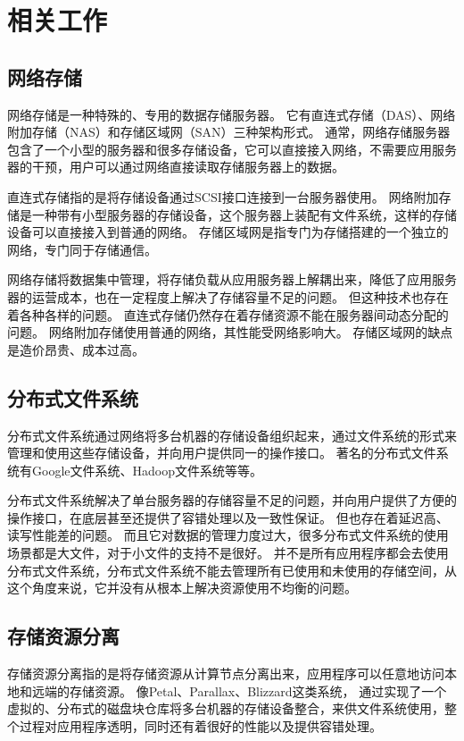 \section{相关工作}

\subsection{网络存储}
网络存储是一种特殊的、专用的数据存储服务器。
它有直连式存储（DAS）、网络附加存储（NAS）和存储区域网（SAN）三种架构形式。
通常，网络存储服务器包含了一个小型的服务器和很多存储设备，它可以直接接入网络，不需要应用服务器的干预，用户可以通过网络直接读取存储服务器上的数据。

直连式存储指的是将存储设备通过SCSI接口连接到一台服务器使用。
网络附加存储是一种带有小型服务器的存储设备，这个服务器上装配有文件系统，这样的存储设备可以直接接入到普通的网络。
存储区域网是指专门为存储搭建的一个独立的网络，专门同于存储通信。

网络存储将数据集中管理，将存储负载从应用服务器上解耦出来，降低了应用服务器的运营成本，也在一定程度上解决了存储容量不足的问题。
但这种技术也存在着各种各样的问题。
直连式存储仍然存在着存储资源不能在服务器间动态分配的问题。
网络附加存储使用普通的网络，其性能受网络影响大。
存储区域网的缺点是造价昂贵、成本过高。

\subsection{分布式文件系统}
分布式文件系统通过网络将多台机器的存储设备组织起来，通过文件系统的形式来管理和使用这些存储设备，并向用户提供同一的操作接口。
著名的分布式文件系统有Google文件系统\cite{gfs}、Hadoop\cite{shvachko2010hadoop}文件系统等等。

分布式文件系统解决了单台服务器的存储容量不足的问题，并向用户提供了方便的操作接口，在底层甚至还提供了容错处理以及一致性保证。
但也存在着延迟高、读写性能差的问题。
而且它对数据的管理力度过大，很多分布式文件系统的使用场景都是大文件，对于小文件的支持不是很好。
并不是所有应用程序都会去使用分布式文件系统，分布式文件系统不能去管理所有已使用和未使用的存储空间，从这个角度来说，它并没有从根本上解决资源使用不均衡的问题。

\subsection{存储资源分离}
存储资源分离指的是将存储资源从计算节点分离出来，应用程序可以任意地访问本地和远端的存储资源。
像Petal\cite{lee1996petal}、Parallax\cite{warfield2005parallax}、Blizzard\cite{mickens2014blizzard}这类系统，
通过实现了一个虚拟的、分布式的磁盘块仓库将多台机器的存储设备整合，来供文件系统使用，整个过程对应用程序透明，同时还有着很好的性能以及提供容错处理。


